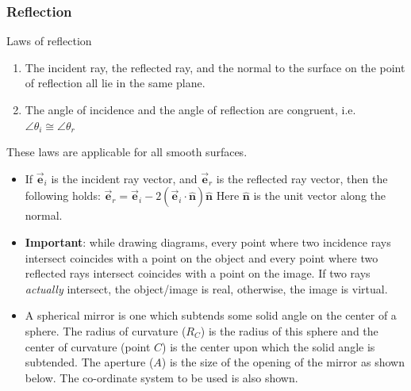 \documentclass{scrartcl}
\begin{document}
    \subsubsection{Reflection}
    \newline\quad Laws of reflection
    \begin{enumerate}
        \item The incident ray, the reflected ray, and the normal to the surface on the point of reflection all lie in the same plane.
        \item The angle of incidence and the angle of reflection are congruent, i.e. $\boxed{\angle \theta_i\cong\angle \theta_r}$
    \end{enumerate}
    \quad These laws are applicable for all smooth surfaces.
    \begin{itemize}
        \item If $\vec{\mathbf e}_i$ is the incident ray vector, and $\vec{\mathbf e}_r$ is the reflected ray vector, then the following holds: $\boxed{\vec{\mathbf e}_r=\vec{\mathbf e}_i-2\left(\vec{\mathbf e}_i\cdot\hat{\mathbf n}\right)\hat{\mathbf n}}$ Here $\hat{\mathbf n}$ is the unit vector along the normal.
        \item \textbf{Important}: while drawing diagrams, every point where two incidence rays intersect coincides with a point on the object and every point where two reflected rays intersect coincides with a point on the image. If two rays \textit{actually} intersect, the object/image is real, otherwise, the image is virtual.
        \item A spherical mirror is one which subtends some solid angle on the center of a sphere. The radius of curvature ($R_C$) is the radius of this sphere and the center of curvature (point $C$) is the center upon which the solid angle is subtended. The aperture ($A$) is the size of the opening of the mirror as shown below. The co-ordinate system to be used is also shown.
    \end{itemize}
\end{document}
